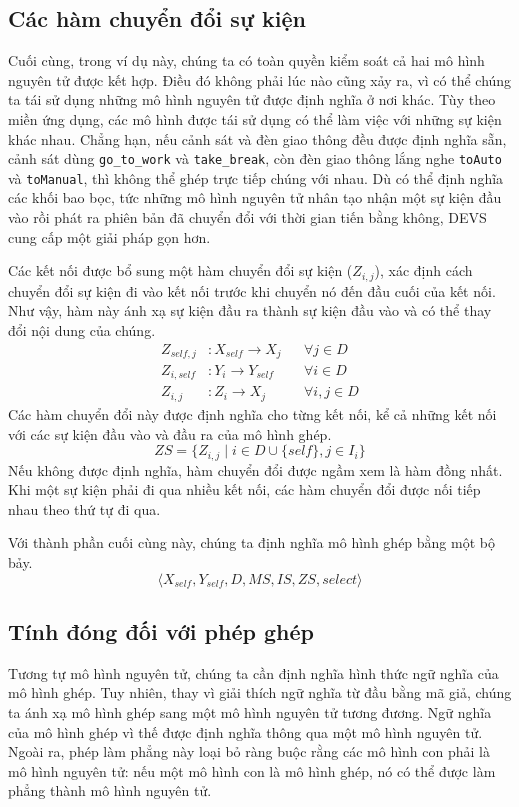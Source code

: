 \subsection{Các hàm chuyển đổi sự kiện}
Cuối cùng, trong ví dụ này, chúng ta có toàn quyền kiểm soát cả hai mô hình nguyên tử được kết hợp. Điều đó không phải lúc nào cũng xảy ra, vì có thể chúng ta tái sử dụng những mô hình nguyên tử được định nghĩa ở nơi khác. Tùy theo miền ứng dụng, các mô hình được tái sử dụng có thể làm việc với những sự kiện khác nhau. Chẳng hạn, nếu cảnh sát và đèn giao thông đều được định nghĩa sẵn, cảnh sát dùng \texttt{go\_to\_work} và \texttt{take\_break}, còn đèn giao thông lắng nghe \texttt{toAuto} và \texttt{toManual}, thì không thể ghép trực tiếp chúng với nhau. Dù có thể định nghĩa các khối bao bọc, tức những mô hình nguyên tử nhân tạo nhận một sự kiện đầu vào rồi phát ra phiên bản đã chuyển đổi với thời gian tiến bằng không, DEVS cung cấp một giải pháp gọn hơn.

Các kết nối được bổ sung một hàm chuyển đổi sự kiện ($Z_{i,j}$), xác định cách chuyển đổi sự kiện đi vào kết nối trước khi chuyển nó đến đầu cuối của kết nối. Như vậy, hàm này ánh xạ sự kiện đầu ra thành sự kiện đầu vào và có thể thay đổi nội dung của chúng.
\begin{align*}
Z_{self,j}&:X_{self}\to X_j &&\forall j\in D\\
Z_{i,self}&:Y_i\to Y_{self} &&\forall i\in D\\
Z_{i,j}&:Z_i\to X_j &&\forall i,j\in D
\end{align*}
Các hàm chuyển đổi này được định nghĩa cho từng kết nối, kể cả những kết nối với các sự kiện đầu vào và đầu ra của mô hình ghép.
\[
ZS=\{Z_{i,j}\mid i\in D\cup\{self\},j\in I_i\}
\]
Nếu không được định nghĩa, hàm chuyển đổi được ngầm xem là hàm đồng nhất. Khi một sự kiện phải đi qua nhiều kết nối, các hàm chuyển đổi được nối tiếp nhau theo thứ tự đi qua.

Với thành phần cuối cùng này, chúng ta định nghĩa mô hình ghép bằng một bộ bảy.
\[
\langle X_{self},Y_{self},D,MS,IS,ZS,select\rangle
\]

\subsection{Tính đóng đối với phép ghép}
Tương tự mô hình nguyên tử, chúng ta cần định nghĩa hình thức ngữ nghĩa của mô hình ghép. Tuy nhiên, thay vì giải thích ngữ nghĩa từ đầu bằng mã giả, chúng ta ánh xạ mô hình ghép sang một mô hình nguyên tử tương đương. Ngữ nghĩa của mô hình ghép vì thế được định nghĩa thông qua một mô hình nguyên tử. Ngoài ra, phép làm phẳng này loại bỏ ràng buộc rằng các mô hình con phải là mô hình nguyên tử: nếu một mô hình con là mô hình ghép, nó có thể được làm phẳng thành mô hình nguyên tử.

